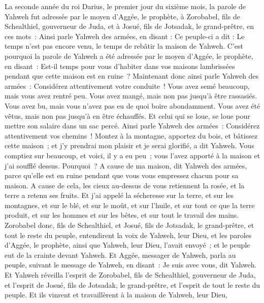\begin{multicols}{2}
\VerseOne{}La seconde année du roi Darius, le premier jour du sixième mois, la parole de Yahweh fut adressée par le moyen d'Aggée, le prophète, à Zorobabel, fils de Schealthiel, gouverneur de Juda, et à Josué, fils de Jotsadak, le grand-prêtre, en ces mots~:
Ainsi parle Yahweh des armées, en disant : Ce peuple-ci a dit : Le temps n'est pas encore venu, le temps de rebâtir la maison de Yahweh.
C'est pourquoi la parole de Yahweh a été adressée par le moyen d'Aggée, le prophète, en disant~:
Est-il temps pour vous d'habiter dans vos maisons lambrissées pendant que cette maison est en ruine~?
Maintenant donc ainsi parle Yahweh des armées~: Considérez attentivement votre conduite~!
Vous avez semé beaucoup, mais vous avez rentré peu. Vous avez mangé, mais non pas jusqu'à être rassasiés. Vous avez bu, mais vous n'avez pas eu de quoi boire abondamment. Vous avez été vêtus, mais non pas jusqu'à en être échauffés. Et celui qui se loue, se loue pour mettre son salaire dans un sac percé.
Ainsi parle Yahweh des armées~: Considérez attentivement vos chemins~!
Montez à la montagne, apportez du bois, et bâtissez cette maison~; et j'y prendrai mon plaisir et je serai glorifié, a dit Yahweh.
Vous comptiez sur beaucoup, et voici, il y a eu peu~; vous l'avez apporté à la maison et j'ai soufflé dessus. Pourquoi~? A cause de ma maison, dit Yahweh des armées, parce qu'elle est en ruine pendant que vous vous empressez chacun pour sa maison.
A cause de cela, les cieux au-dessus de vous retiennent la rosée, et la terre a retenu ses fruits.
Et j'ai appelé la sécheresse sur la terre, et sur les montagnes, et sur le blé, et sur le moût, et sur l'huile, et sur tout ce que la terre produit, et sur les hommes et sur les bêtes, et sur tout le travail des mains.
Zorobabel donc, fils de Schealthiel, et Josué, fils de Jotsadak, le grand-prêtre, et tout le reste du peuple, entendirent la voix de Yahweh, leur Dieu, et les paroles d'Aggée, le prophète, ainsi que Yahweh, leur Dieu, l'avait envoyé~; et le peuple eut de la crainte devant Yahweh.
Et Aggée, messager de Yahweh, parla au peuple, suivant le message de Yahweh, en disant~: Je suis avec vous, dit Yahweh.
Et Yahweh réveilla l'esprit de Zorobabel, fils de Schealthiel, gouverneur de Juda, et l'esprit de Josué, fils de Jotsadak, le grand-prêtre, et l'esprit de tout le reste du peuple. Et ils vinrent et travaillèrent à la maison de Yahweh, leur Dieu,

\end{multicols}
